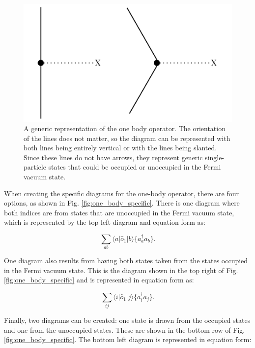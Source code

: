 \begin{figure}
    \centering
    \includegraphics[scale=0.25]{Images/Chapter2/one_body_generic.png}
    \caption{A generic representation of the one body operator. The orientation of the lines does not matter, so the diagram can be represented with both lines being entirely vertical or with the lines being slanted. Since these lines do not have arrows, they represent generic single-particle states that could be occupied or unoccupied in the Fermi vacuum state.}
    \label{fig:one_body_generic}
\end{figure}

When creating the specific diagrams for the one-body operator, there are four options, as shown in Fig. \ref{fig:one_body_specific}.  There is one diagram where both indices are from states that are unoccupied in the Fermi vacuum state, which is represented by the top left diagram and equation form as:

\begin{equation}
    \sum_{ab} \langle a | \hat{o}_1 | b \rangle \{a^\dagger_aa_b\}.
\end{equation}

One diagram also results from having both states taken from the states occupied in the Fermi vacuum state. This is the diagram shown in the top right of Fig. \ref{fig:one_body_specific} and is represented in equation form as: 

\begin{equation}
    \sum_{ij} \langle i | \hat{o}_1 | j \rangle \{a^\dagger_ia_j\}.
\end{equation}

Finally, two diagrams can be created: one state is drawn from the occupied states and one from the unoccupied states. These are shown in the bottom row of Fig. \ref{fig:one_body_specific}. The bottom left diagram is represented in equation form:

